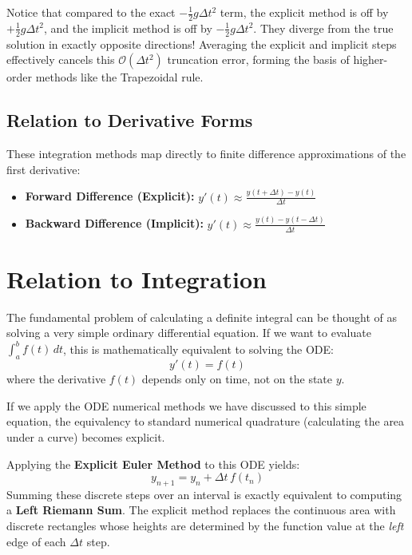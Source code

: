\documentclass[11pt]{article}
\begin{document}
Notice that compared to the exact $-\frac{1}{2}g\Delta t^2$ term, the explicit method is off by $+\frac{1}{2}g\Delta t^2$, and the implicit method is off by $-\frac{1}{2}g\Delta t^2$. They diverge from the true solution in exactly opposite directions! Averaging the explicit and implicit steps effectively cancels this $\mathcal{O}(\Delta t^2)$ truncation error, forming the basis of higher-order methods like the Trapezoidal rule.

\subsection{Relation to Derivative Forms}
These integration methods map directly to finite difference approximations of the first derivative:
\begin{itemize}
    \item \textbf{Forward Difference (Explicit):} $y'(t) \approx \frac{y(t+\Delta t) - y(t)}{\Delta t}$
    \item \textbf{Backward Difference (Implicit):} $y'(t) \approx \frac{y(t) - y(t-\Delta t)}{\Delta t}$
\end{itemize}

\section{Relation to Integration}

The fundamental problem of calculating a definite integral can be thought of as solving a very simple ordinary differential equation. If we want to evaluate $\int_a^b f(t) \, dt$, this is mathematically equivalent to solving the ODE:
\begin{equation}
    y'(t) = f(t)
\end{equation}
where the derivative $f(t)$ depends only on time, not on the state $y$. 

If we apply the ODE numerical methods we have discussed to this simple equation, the equivalency to standard numerical quadrature (calculating the area under a curve) becomes explicit.

Applying the \textbf{Explicit Euler Method} to this ODE yields:
\begin{equation}
    y_{n+1} = y_n + \Delta t \, f(t_n)
\end{equation}
Summing these discrete steps over an interval is exactly equivalent to computing a \textbf{Left Riemann Sum}. The explicit method replaces the continuous area with discrete rectangles whose heights are determined by the function value at the \textit{left} edge of each $\Delta t$ step.
\end{document}
